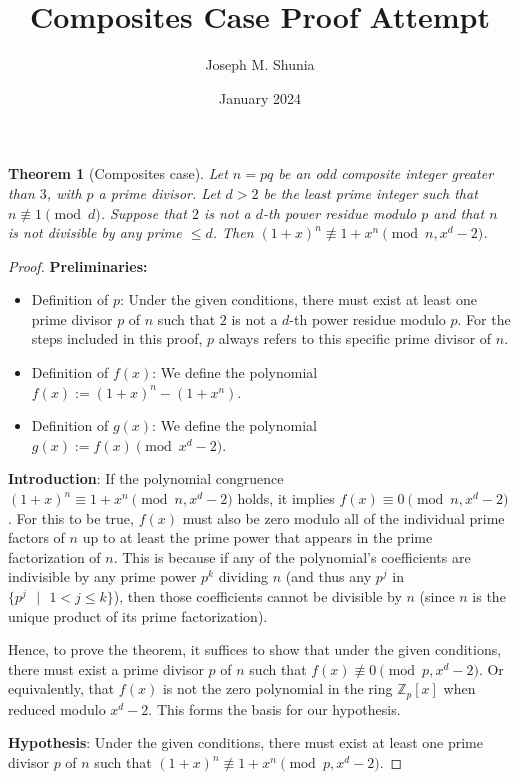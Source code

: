 \documentclass{article}
\title{Composites Case Proof Attempt}
\author{Joseph M. Shunia}
\date{January 2024}
\theoremstyle{plain}
\theoremstyle{definition}
\newtheorem{theorem}{Theorem}
\begin{document}
\maketitle

\begin{theorem}[Composites case] \label{theorem:composites}
\textit{Let $n = pq$ be an odd composite integer greater than $3$, with $p$ a prime divisor. Let $d > 2$ be the least prime integer such that $n \not\equiv 1 \pmod{d}$. Suppose that $2$ is not a $d$-th power residue modulo $p$ and that $n$ is not divisible by any prime $\leq d$. Then $(1 + x)^n \not\equiv 1 + x^n \pmod{n, x^d-2}$.}
\end{theorem}
\begin{proof}
\textbf{Preliminaries:}
\begin{itemize}
    \item Definition of $p$: Under the given conditions, there must exist at least one prime divisor $p$ of $n$ such that $2$ is not a $d$-th power residue modulo $p$. For the steps included in this proof, $p$ always refers to this specific prime divisor of $n$.
    \item Definition of $f(x)$: We define the polynomial $f(x) := (1 + x)^n - (1 + x^n)$.
    \item Definition of $g(x)$: We define the polynomial $g(x) := f(x) \pmod{x^d - 2}$.
\end{itemize}

\textbf{Introduction}:
If the polynomial congruence $(1 + x)^n \equiv 1 + x^n \pmod{n, x^d-2}$ holds, it implies $f(x) \equiv 0 \pmod{n, x^d-2}$. For this to be true, $f(x)$ must also be zero modulo all of the individual prime factors of $n$ up to at least the prime power that appears in the prime factorization of $n$. This is because if any of the polynomial's coefficients are indivisible by any prime power $p^k$ dividing $n$ (and thus any $p^j$ in $\{ p^j \text{ } | \text{ } 1 < j \leq k \}$), then those coefficients cannot be divisible by $n$ (since $n$ is the unique product of its prime factorization).

Hence, to prove the theorem, it suffices to show that under the given conditions, there must exist a prime divisor $p$ of $n$ such that $f(x) \not\equiv 0 \pmod{p, x^d-2}$. Or equivalently, that $f(x)$ is not the zero polynomial in the ring $\mathbb{Z}_p[x]$ when reduced modulo $x^d-2$. This forms the basis for our hypothesis.

\textbf{Hypothesis}: Under the given conditions, there must exist at least one prime divisor $p$ of $n$ such that $(1 + x)^n \not\equiv 1 + x^n \pmod{p, x^d-2}$.


\end{proof}
\end{document}
